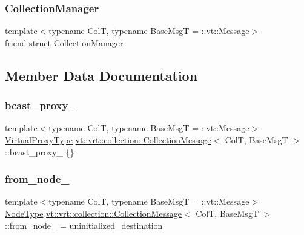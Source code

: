 \subsubsection{\texorpdfstring{Collection\+Manager}{CollectionManager}}
{\footnotesize\ttfamily template$<$typename ColT, typename Base\+MsgT = \+::vt\+::\+Message$>$ \\
friend struct \hyperlink{structvt_1_1vrt_1_1collection_1_1_collection_manager}{Collection\+Manager}\hspace{0.3cm}{\ttfamily [friend]}}



\subsection{Member Data Documentation}
\mbox{\label{structvt_1_1vrt_1_1collection_1_1_collection_message_a7b1563ec7a2d15faba3b252304beefb6}} 
\subsubsection{\texorpdfstring{bcast\+\_\+proxy\+\_\+}{bcast\_proxy\_}}
{\footnotesize\ttfamily template$<$typename ColT, typename Base\+MsgT = \+::vt\+::\+Message$>$ \\
\hyperlink{namespacevt_a1b417dd5d684f045bb58a0ede70045ac}{Virtual\+Proxy\+Type} \hyperlink{structvt_1_1vrt_1_1collection_1_1_collection_message}{vt\+::vrt\+::collection\+::\+Collection\+Message}$<$ ColT, Base\+MsgT $>$\+::bcast\+\_\+proxy\+\_\+ \{\}\hspace{0.3cm}{\ttfamily [private]}}

\mbox{\label{structvt_1_1vrt_1_1collection_1_1_collection_message_aa129673e8d91d5e3e662f15ae0d8d5fa}} 
\subsubsection{\texorpdfstring{from\+\_\+node\+\_\+}{from\_node\_}}
{\footnotesize\ttfamily template$<$typename ColT, typename Base\+MsgT = \+::vt\+::\+Message$>$ \\
\hyperlink{namespacevt_a866da9d0efc19c0a1ce79e9e492f47e2}{Node\+Type} \hyperlink{structvt_1_1vrt_1_1collection_1_1_collection_message}{vt\+::vrt\+::collection\+::\+Collection\+Message}$<$ ColT, Base\+MsgT $>$\+::from\+\_\+node\+\_\+ = uninitialized\+\_\+destination\hspace{0.3cm}{\ttfamily [private]}}

